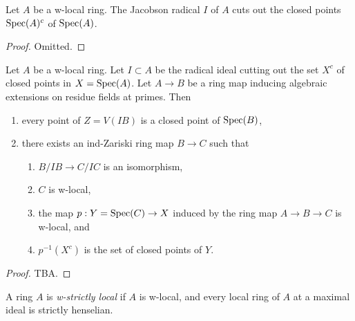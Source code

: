 \begin{lemma}%
  \label{thm:w-local-jacobson-radical}
  Let $A$ be a w-local ring. The Jacobson radical \(I\) of \(A\) cuts out the closed points \(\operatorname{Spec}(A)^c\) of \(\operatorname{Spec}(A)\).
\end{lemma}

\begin{proof}
  Omitted.
\end{proof}

\begin{lemma}
\label{thm:closed-points-isom-w-local}
Let $A$ be a w-local ring. Let $I \subset A$ be the radical ideal cutting out the set $X^c$ of closed points in $X = \operatorname{Spec} (A)$.
Let $A \to B$ be a ring map inducing algebraic extensions on residue fields at primes. Then
\begin{enumerate}
    \item every point of $Z = V(IB)$ is a closed point of $\operatorname{Spec} (B)$,
    \item there exists an ind-Zariski ring map $B \to C$ such that
    \begin{enumerate}
        \item $B/IB \to C/IC$ is an isomorphism, \label{item:quotinet-isom-closed-points-isom-w-local} %
        \item $C$ is w-local, \label{item:w-local-closed-points-isom-w-local}
        \item the map $p: Y = \operatorname{Spec} (C) \to X$ induced by the ring map $A \to B \to C$ is w-local, and %
        \item $p^{-1}(X^c)$ is the set of closed points of $Y$. \label{item:inverse-image-closed-points-isom-w-local}
    \end{enumerate}
\end{enumerate}
\end{lemma}

\begin{proof}
  TBA.
\end{proof}


\begin{definition}
    A ring \(A\) is \emph{w-strictly local} if \(A\) is w-local, and every local ring of \(A\) at a maximal ideal is strictly henselian.
    \label{def:w-strictly-local-ring}
\end{definition}

